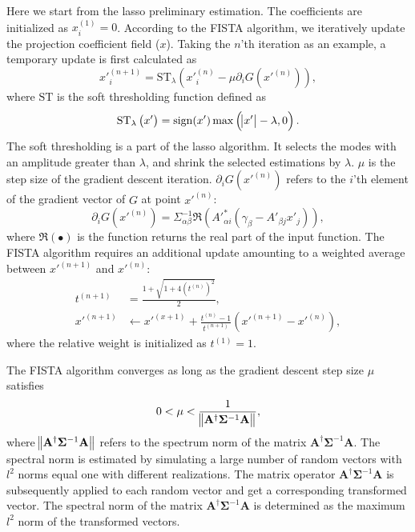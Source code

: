 Here we start from the lasso preliminary estimation. The coefficients are
initialized as $x_i^{(1)}=0$. According to the FISTA algorithm, we iteratively
update the projection coefficient field ($x$). Taking the $n$'th iteration as
an example, a temporary update is first calculated as
\begin{equation}
x'^{(n+1)}_{i}=\mathrm{ST}_{\lambda} \left(x'^{(n)}_{i} -\mu \partial_i G(x'^{(n)})\right),
\end{equation}
where $\mathrm{ST}$ is the soft thresholding function defined as
\begin{equation}
\mathrm{ST}_{\lambda} \left(x'\right) = \mathrm{sign} (x') \max \left(\abs{x'}-\lambda,0\right).
\end{equation}
The soft thresholding is a part of the lasso algorithm. It selects the
modes with an amplitude greater than $\lambda$, and shrink the selected
estimations by
$\lambda$.
$\mu$ is the step size of the gradient descent iteration.  $\partial_i
G(x'^{(n)})$ refers to the $i$'th element of the gradient vector of $G$ at
point $x'^{(n)}$:
\begin{equation}
\partial_i G(x'^{(n)})=\Sigma^{-1}_{\alpha\beta}\Re\left(A'^{*}_{\alpha i}(\gamma_{\beta}-A'_{\beta j}x'_{j})\right),
\end{equation}
where $\Re\left( \bullet \right)$ is the function returns the real part of the
input function. The FISTA algorithm requires an additional update amounting to a
weighted average between
$x'^{(n+1)}$ and $x'^{(n)}$:
\begin{equation}
\begin{split}
t^{(n+1)}&=\frac{1+\sqrt{1+4(t^{(n)})^2}}{2},\\
x'^{(n+1)} &\leftarrow x'^{(x+1)}+ \frac{t^{(n)}-1}{t^{(n+1)}}(x'^{(n+1)}-x'^{(n)}),
\end{split}
\end{equation}
where the relative weight is initialized as $t^{(1)}=1$.

The FISTA algorithm converges as long as the gradient descent step size $\mu$
satisfies
\begin{equation}
 0< \mu < \frac{1}{ \norm{\mathbf{A^{\dagger}} \mathbf{\Sigma}^{-1} \mathbf{A} }},
\end{equation}
where $\norm{\mathbf{A^{\dagger}} \mathbf{\Sigma}^{-1} \mathbf{A} }$ refers to
the spectrum norm of the matrix $\mathbf{A^{\dagger}} \mathbf{\Sigma}^{-1}
\mathbf{A}$. The spectral norm is estimated by simulating a large number of
random vectors with $l^2$ norms equal one with different realizations. The
matrix operator $\mathbf{A^{\dagger}} \mathbf{\Sigma}^{-1} \mathbf{A}$ is
subsequently applied to each random vector and get a corresponding transformed
vector. The spectral norm of the matrix $\mathbf{A^{\dagger}}
\mathbf{\Sigma}^{-1} \mathbf{A}$ is determined as the maximum $l^2$ norm of the
transformed vectors.


